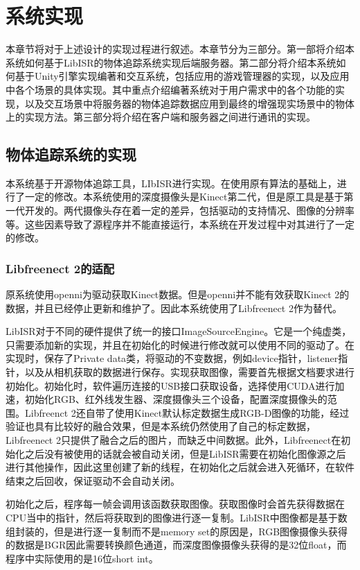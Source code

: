 \chapter{系统实现}
\label{implement}

本章节将对于上述设计的实现过程进行叙述。本章节分为三部分。第一部将介绍本系统如何基于LibISR的物体追踪系统\cite{Ren_3DV_2014, star3d_iccv_2013}实现后端服务器。第二部分将介绍本系统如何基于Unity引擎实现编著和交互系统，包括应用的游戏管理器的实现，以及应用中各个场景的具体实现。其中重点介绍编著系统对于用户需求中的各个功能的实现，以及交互场景中将服务器的物体追踪数据应用到最终的增强现实场景中的物体上的实现方法。第三部分将介绍在客户端和服务器之间进行通讯的实现。

\section{物体追踪系统的实现}
本系统基于开源物体追踪工具，LIbISR进行实现。在使用原有算法的基础上，进行了一定的修改。本系统使用的深度摄像头是Kinect第二代，但是原工具是基于第一代开发的。两代摄像头存在着一定的差异，包括驱动的支持情况、图像的分辨率等。这些因素导致了源程序并不能直接运行，本系统在开发过程中对其进行了一定的修改。

\subsection{Libfreenect 2的适配}

原系统使用openni为驱动获取Kinect数据。但是openni并不能有效获取Kinect 2的数据，并且已经停止更新和维护了。因此本系统使用了Libfreenect 2作为替代。

LibISR对于不同的硬件提供了统一的接口ImageSourceEngine。它是一个纯虚类，只需要添加新的实现，并且在初始化的时候进行修改就可以使用不同的驱动了。在实现时，保存了Private data类，将驱动的不变数据，例如device指针，listener指针，以及从相机获取的数据进行保存。实现获取图像，需要首先根据文档要求进行初始化。初始化时，软件遍历连接的USB接口获取设备，选择使用CUDA进行加速，初始化RGB、红外线发生器、深度摄像头三个设备，配置深度摄像头的范围。Libfreenct 2还自带了使用Kinect默认标定数据生成RGB-D图像的功能，经过验证也具有比较好的融合效果，但是本系统仍然使用了自己的标定数据，Libfreenect 2只提供了融合之后的图片，而缺乏中间数据。此外，Libfreenect在初始化之后没有被使用的话就会被自动关闭，但是LibISR需要在初始化图像源之后进行其他操作，因此这里创建了新的线程，在初始化之后就会进入死循环，在软件结束之后回收，保证驱动不会自动关闭。

初始化之后，程序每一帧会调用该函数获取图像。获取图像时会首先获得数据在CPU当中的指针，然后将获取到的图像进行逐一复制。LibISR中图像都是基于数组封装的，但是进行逐一复制而不是memory set的原因是，RGB图像摄像头获得的数据是BGR因此需要转换颜色通道，而深度图像摄像头获得的是32位float，而程序中实际使用的是16位short int。


